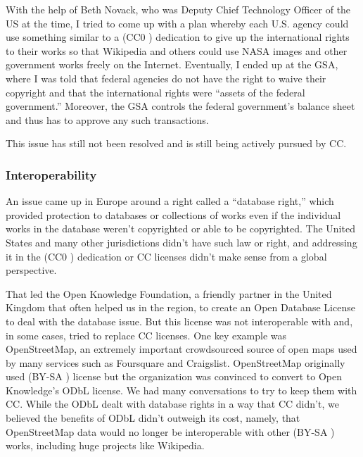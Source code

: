 With the help of Beth Novack, who was Deputy Chief Technology Officer of the US at the time, I tried to come up with a plan whereby each U.S. agency could use something similar to a (CC0 \ccZero) dedication to give up the international rights to their works so that Wikipedia and others could use \ac{NASA} images and other government works freely on the Internet. Eventually, I ended up at the \ac{GSA}, where I was told that federal agencies do not have the right to waive their copyright and that the international rights were ``assets of the federal government.'' Moreover, the \ac{GSA} controls the federal government's balance sheet and thus has to approve any such transactions.

This issue has still not been resolved and is still being actively pursued by \ac{CC}.

\subsubsection{Interoperability}

An issue came up in Europe around a right called a ``database right,'' which provided protection to databases or collections of works even if the individual works in the database weren't copyrighted or able to be copyrighted. The United States and many other jurisdictions didn't have such law or right, and addressing it in the (CC0 \ccZero) dedication or \ac{CC} licenses didn't make sense from a global perspective.

That led the Open Knowledge Foundation, a friendly partner in the United Kingdom that often helped us in the region, to create an Open Database License to deal with the database issue. But this license was not interoperable with and, in some cases, tried to replace \ac{CC} licenses. One key example was OpenStreetMap, an extremely important crowdsourced source of open maps used by many services such as Foursquare and Craigslist. OpenStreetMap originally used (BY-SA \ccbysa) license but the organization was convinced to convert to Open Knowledge's ODbL license. We had many conversations to try to keep them with \ac{CC}. While the ODbL dealt with database rights in a way that \ac{CC} didn't, we believed the benefits of ODbL didn't outweigh its cost, namely, that OpenStreetMap data would no longer be interoperable with other (BY-SA \ccbysa) works, including huge projects like Wikipedia.

